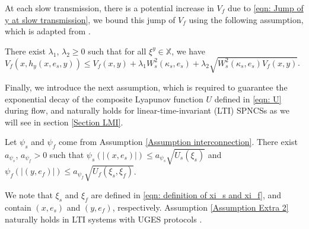 At each slow transmission, there is a potential increase in $V_f$ due to \eqref{eqn: Jump of y at slow transmission}, we bound this jump of $V_f$ using the following assumption, which is adapted from \cite[Assumption 5]{Romain_ETC}.
%
\begin{assum}
    There exist $\lambda_1$, $\lambda_2\geq0$ such that for all $\xi^y \in \mathbb{X}$, we have
    $V_f(x,h_y(x,e_s,y)) \leq  V_f(x,y) +  \lambda_1 W_s^2(\kappa_s,e_s) 
            + \lambda_2 \sqrt{W_s^2(\kappa_s,e_s) V_f(x,y)}$.
    \label{Assumption Vf at slow transmission}%
\end{assum}
Finally, we introduce the next assumption, which is required to guarantee the exponential decay of the composite Lyapunov function $U$ defined in \eqref{eqn: U} during flow, and naturally holds for linear-time-invariant (LTI) SPNCSs as we will see in section \ref{Section LMI}.
\begin{assum}
    Let $\psi_s$ and $\psi_f$ come from Assumption \ref{Assumption interconnection}. There exist $a_{\psi_s}$, $a_{\psi_f}>0$ such that
    $\psi_s(|(x, e_s)|) \leq a_{\psi_s} \sqrt{U_s(\xi_s)}$ and $\psi_f(|(y, e_f)|) \leq a_{\psi_f} \sqrt{U_f(\xi_s,\xi_f)}$.
%    
    \label{Assumption Extra 2}%
\end{assum}
%
We note that $\xi_s $ and $\xi_f$ are defined in \eqref{eqn: definition of xi_s and xi_f}, and contain $(x,e_s)$ and $(y,e_f)$, respectively. Assumption \ref{Assumption Extra 2} naturally holds in LTI systems with UGES protocols \cite{dragan_stability}. 








